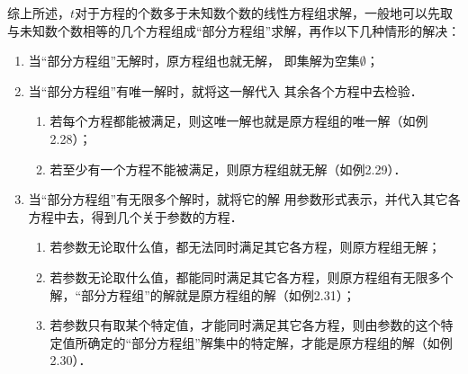 综上所述，$t$对于方程的个数多于未知数个数的线性方程组求解，一般地可以先取与未知数个数相等的几个方程组成“部分方程组”求解，再作以下几种情形的解决：
\begin{enumerate}
    \item 当“部分方程组”无解时，原方程组也就无解，
即集解为空集$\emptyset$；
\item 当“部分方程组”有唯一解时，就将这一解代入
其余各个方程中去检验． 
\begin{enumerate}
    \item 若每个方程都能被满足，则这唯一解也就是原方程组的唯一解（如例2.28）；
    \item 若至少有一个方程不能被满足，则原方程组就无解（如例2.29）．
\end{enumerate}

\item 当“部分方程组”有无限多个解时，就将它的解
用参数形式表示，并代入其它各方程中去，得到几个关于参数的方程．
\begin{enumerate}
    \item 若参数无论取什么值，都无法同时满足其它各方程，则原方程组无解；
    \item 若参数无论取什么值，都能同时满足其它各方程，则原方程组有无限多个解，“部分方程组”的解就是原方程组的解（如例2.31）；
    \item 若参数只有取某个特定值，才能同时满足其它各方程，则由参数的这个特定值所确定的“部分方程组”解集中的特定解，才能是原方程组的解（如例2.30）．
\end{enumerate}

\end{enumerate}

